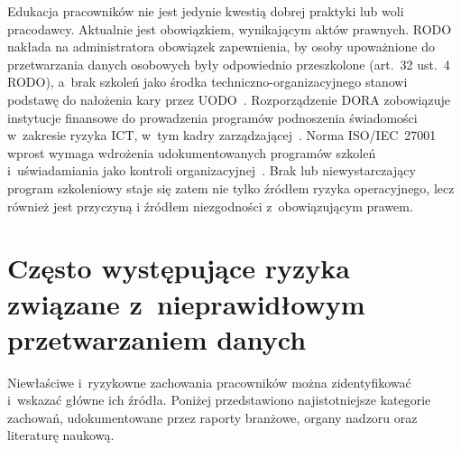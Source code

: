 Edukacja pracowników nie jest jedynie kwestią dobrej praktyki lub woli pracodawcy. Aktualnie jest obowiązkiem, wynikającym aktów prawnych.
RODO nakłada na administratora obowiązek zapewnienia, by osoby upoważnione do przetwarzania danych osobowych były odpowiednio przeszkolone (art.~32 ust.~4 RODO),
a~brak szkoleń jako środka techniczno-organizacyjnego stanowi  podstawę do nałożenia kary przez UODO~\autocite{isoqar_blad_ludzki}. Rozporządzenie DORA
zobowiązuje instytucje finansowe do prowadzenia programów podnoszenia świadomości w~zakresie ryzyka ICT, w~tym kadry zarządzającej~\autocite{nflo_dora}.
Norma ISO/IEC~27001 wprost wymaga wdrożenia udokumentowanych programów szkoleń i~uświadamiania jako kontroli organizacyjnej~\autocite{isoqar_blad_ludzki}.
Brak lub niewystarczający program szkoleniowy staje się zatem nie tylko źródłem
ryzyka operacyjnego, lecz również jest przyczyną i źródłem niezgodności z~obowiązującym prawem.

\section{Często występujące ryzyka związane z~nieprawidłowym przetwarzaniem danych}

Niewłaściwe i~ryzykowne zachowania pracowników można zidentyfikować i~wskazać główne
ich źródła. Poniżej przedstawiono najistotniejsze kategorie zachowań, udokumentowane
przez raporty branżowe, organy nadzoru oraz literaturę naukową.

